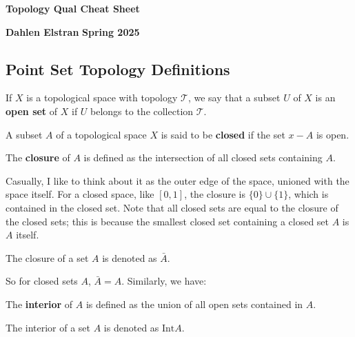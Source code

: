 \documentclass[12pt]{article}
\begin{document}
\begin{newtitle}
  \begin{center}
    \textbf{\Huge Topology Qual Cheat Sheet}
  \end{center}
  \textbf{Dahlen Elstran} \hfill \textbf{Spring 2025}
\end{newtitle}

\begin{center} \section*{Point Set Topology Definitions} \end{center}

\begin{definition}
  If $X$ is a topological space with topology $\mathcal{T}$, we say that a subset $U$ of $X$ 
  is an \textbf{open set} of $X$ if $U$ belongs to the collection $\mathcal{T}$.
\end{definition}

\begin{definition}
  A subset $A$ of a topological space $X$ is said to be \textbf{closed} if the set $x - A$ is open.
\end{definition}

\begin{definition}
  The \textbf{closure} of $A$ is defined as the intersection of all closed sets containing $A$.
\end{definition}

Casually, I like to think about it as the outer edge of the space, unioned with the space itself. For a closed space, like $[0,1]$, 
the closure is $\{0\} \cup \{1\}$, which is contained in the closed set. Note that all closed sets are equal to the closure of the
closed sets; this is because the smallest closed set containing a closed set $A$ is $A$ itself. 

\begin{notation}
  The closure of a set $A$ is denoted as $\bar{A}$.
\end{notation}

So for closed sets $A$, $\bar{A} = A$. Similarly, we have:

\begin{definition}
  The \textbf{interior} of $A$ is defined as the union of all open sets contained in $A$.
\end{definition}

\begin{notation}
  The interior of a set $A$ is denoted as $\text{Int} A$.
\end{notation}
\end{document}
